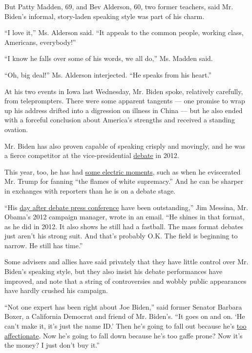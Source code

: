 But Patty Madden, 69, and Bev Alderson, 60, two former teachers, said
Mr. Biden's informal, story-laden speaking style was part of his charm.

``I love it,'' Ms. Alderson said. ``It appeals to the common people,
working class, Americans, everybody!''

``I know he falls over some of his words, we all do,'' Ms. Madden said.

``Oh, big deal!'' Ms. Alderson interjected. ``He speaks from his
heart.''

At his two events in Iowa last Wednesday, Mr. Biden spoke, relatively
carefully, from teleprompters. There were some apparent tangents --- one
promise to wrap up his address drifted into a digression on illness in
China --- but he also ended with a forceful conclusion about America's
strengths and received a standing ovation.

Mr. Biden has also proven capable of speaking crisply and movingly, and
he was a fierce competitor at the vice-presidential
\href{https://www.nytimes.com/2012/10/12/us/politics/biden-takes-off-gloves-in-vice-presidential-debate.html}{debate}
in 2012.

This year, too, he has had
\href{https://www.nytimes.com/2019/08/07/us/politics/cory-booker-speech-mother-emanuel.html}{some
electric moments}, such as when he eviscerated Mr. Trump for fanning
``the flames of white supremacy.'' And he can be sharper in exchanges
with reporters than he is on a debate stage.

``His
\href{https://www.nytimes.com/2019/10/16/us/politics/joe-biden-elizabeth-warren.html}{day
after debate press conference} have been outstanding,'' Jim Messina, Mr.
Obama's 2012 campaign manager, wrote in an email. ``He shines in that
format, as he did in 2012. It also shows he still had a fastball. The
mass format debates just aren't his strong suit. And that's probably
O.K. The field is beginning to narrow. He still has time.''

Some advisers and allies have said privately that they have little
control over Mr. Biden's speaking style, but they also insist his debate
performances have improved, and note that a string of controversies and
wobbly public appearances have hardly crushed his campaign.

``Not one expert has been right about Joe Biden,'' said former Senator
Barbara Boxer, a California Democrat and friend of Mr. Biden's. ``It
goes on and on. `He can't make it, it's just the name ID.' Then he's
going to fall out because he's
\href{https://www.nytimes.com/2019/08/29/us/politics/joe-biden-women.html}{too
affectionate}. Now he's going to fall down because he's too gaffe prone?
Now it's the money? I just don't buy it.''

